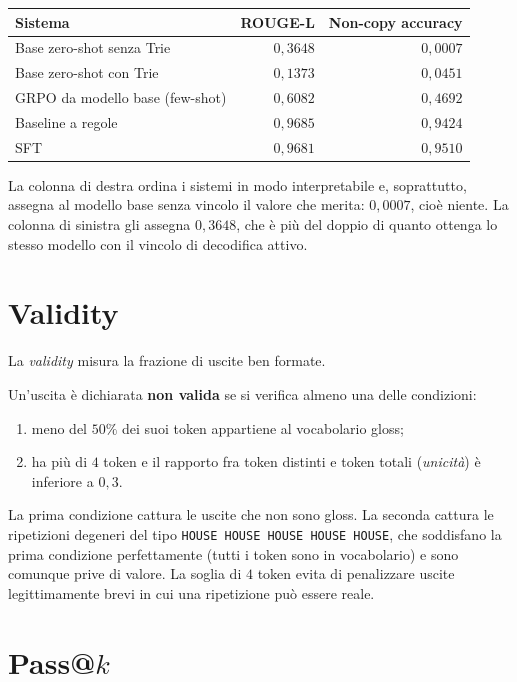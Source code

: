 \begin{center}
\begin{tabular}{lrr}
\toprule
Sistema & ROUGE-L & Non-copy accuracy \\
\midrule
Base zero-shot senza Trie & $0{,}3648$ & $0{,}0007$ \\
Base zero-shot con Trie & $0{,}1373$ & $0{,}0451$ \\
GRPO da modello base (few-shot) & $0{,}6082$ & $0{,}4692$ \\
Baseline a regole & $0{,}9685$ & $0{,}9424$ \\
SFT & $0{,}9681$ & $0{,}9510$ \\
\bottomrule
\end{tabular}
\end{center}

La colonna di destra ordina i sistemi in modo interpretabile e, soprattutto,
assegna al modello base senza vincolo il valore che merita: $0{,}0007$, cioè
niente. La colonna di sinistra gli assegna $0{,}3648$, che è più del doppio di
quanto ottenga lo stesso modello con il vincolo di decodifica attivo.

\section{Validity}

La \emph{validity} misura la frazione di uscite ben formate.

Un'uscita è dichiarata \textbf{non valida} se si verifica
almeno una delle condizioni:

\begin{enumerate}
  \item meno del $50\%$ dei suoi token appartiene al vocabolario gloss;
  \item ha più di $4$ token e il rapporto fra token distinti e token totali
        (\emph{unicità}) è inferiore a $0{,}3$.
\end{enumerate}

La prima condizione cattura le uscite che non sono gloss. La seconda cattura le
ripetizioni degeneri del tipo \texttt{HOUSE HOUSE HOUSE HOUSE HOUSE}, che
soddisfano la prima condizione perfettamente (tutti i token sono in
vocabolario) e sono comunque prive di valore. La soglia di $4$ token evita di
penalizzare uscite legittimamente brevi in cui una ripetizione può essere reale.

\section{Pass@$k$}

